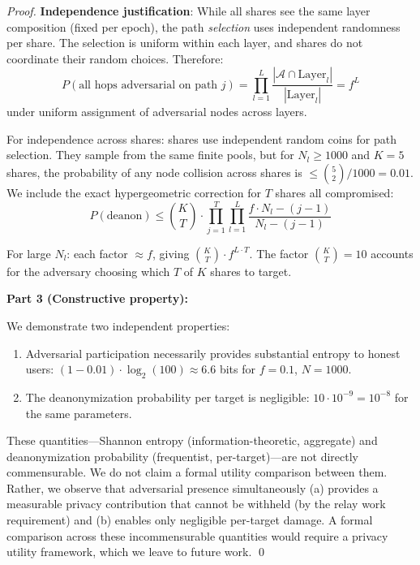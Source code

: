 \documentclass[11pt,a4paper]{article}
\newcommand{\Adv}{\mathcal{A}}
\begin{document}
\begin{proof}
\textbf{Independence justification}: While all shares see the same layer composition (fixed per epoch), the path \emph{selection} uses independent randomness per share. The selection is uniform within each layer, and shares do not coordinate their random choices. Therefore:
\[
P(\text{all hops adversarial on path } j) = \prod_{l=1}^{L} \frac{|\Adv \cap \text{Layer}_l|}{|{\text{Layer}_l}|} = f^L
\]
under uniform assignment of adversarial nodes across layers.

For independence across shares: shares use independent random coins for path selection. They sample from the same finite pools, but for $N_l \geq 1000$ and $K = 5$ shares, the probability of any node collision across shares is $\leq \binom{5}{2}/1000 = 0.01$. We include the exact hypergeometric correction for $T$ shares all compromised:
\[
P(\text{deanon}) \leq \binom{K}{T} \cdot \prod_{j=1}^{T} \prod_{l=1}^{L} \frac{f \cdot N_l - (j-1)}{N_l - (j-1)}
\]

For large $N_l$: each factor $\approx f$, giving $\binom{K}{T} \cdot f^{L \cdot T}$. The factor $\binom{K}{T} = 10$ accounts for the adversary choosing which $T$ of $K$ shares to target.

\textbf{Part 3 (Constructive property):}

We demonstrate two independent properties:
\begin{enumerate}[nosep]
    \item Adversarial participation necessarily provides substantial entropy to honest users: $(1 - 0.01) \cdot \log_2(100) \approx 6.6$ bits for $f=0.1$, $N=1000$.
    \item The deanonymization probability per target is negligible: $10 \cdot 10^{-9} = 10^{-8}$ for the same parameters.
\end{enumerate}

These quantities---Shannon entropy (information-theoretic, aggregate) and deanonymization probability (frequentist, per-target)---are not directly commensurable. We do not claim a formal utility comparison between them. Rather, we observe that adversarial presence simultaneously (a) provides a measurable privacy contribution that cannot be withheld (by the relay work requirement) and (b) enables only negligible per-target damage. A formal comparison across these incommensurable quantities would require a privacy utility framework, which we leave to future work. \qed
\end{proof}
\end{document}
